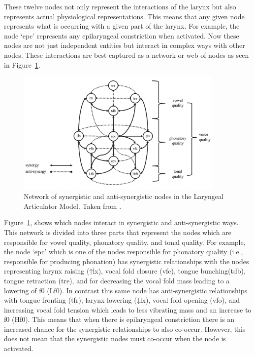 \documentclass[12pt, letterpaper]{article}
\begin{document}
These twelve nodes not only represent the interactions of the larynx but also represents actual physiological representations. This means that any given node represents what is occurring with a given part of the larynx. For example, the node `epc'  represents any epilaryngeal constriction when activated. Now these nodes are not just independent entities but interact in complex ways with other nodes. These interactions are best captured as a network or web of nodes as seen in Figure~\ref{fig:LAMNetwork}. 

\begin{figure}[!ht]
	\centering
	\includegraphics[width=0.9\textwidth]{../LAMNetwork.png}
	\caption{Network of synergistic and anti-synergistic nodes in the Laryngeal Articulator Model. Taken from \citet{eslingVoiceQualityLaryngeal2019}.}
	\label{fig:LAMNetwork}
\end{figure}
	
Figure~\ref{fig:LAMNetwork}, shows which nodes interact in synergistic and anti-synergistic ways. This network is divided into three parts that represent the nodes which are responsible for vowel quality, phonatory quality, and tonal quality. For example, the node `epc' which is one of the nodes responsible for phonatory quality (i.e., responsible for producing phonation) has synergistic relationships with the nodes representing larynx raising (↑lx), vocal fold closure (vfc), tongue bunching(tdb), tongue retraction (tre), and for decreasing the vocal fold mass leading to a lowering of f0 (Lf0). In contrast this same node has anti-synergistic relationships with tongue fronting (tfr), larynx lowering (↓lx), vocal fold opening (vfo), and increasing vocal fold tension which leads to less vibrating mass and an increase to f0 (Hf0). This means that when there is epilaryngeal constriction there is an increased chance for the synergistic relationships to also co-occur. However, this does not mean that the synergistic nodes must co-occur when the node is activated. 
\end{document}
